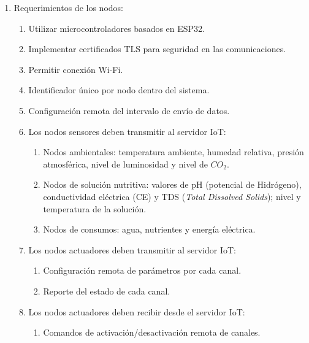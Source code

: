 \begin{enumerate}
      \item Requerimientos de los nodos:
            \begin{enumerate}
                  \item Utilizar microcontroladores basados en ESP32.
                  \item Implementar certificados TLS para seguridad en las comunicaciones.
                  \item Permitir conexión Wi-Fi.
                  \item Identificador único por nodo dentro del sistema.
                  \item Configuración remota del intervalo de envío de datos.
                  \item Los nodos sensores deben transmitir al servidor IoT:
                        \begin{enumerate}
                              \item Nodos ambientales: temperatura ambiente, humedad relativa, presión atmosférica, nivel de
                                    luminosidad y nivel de $CO_2$.
                              \item Nodos de solución nutritiva: valores de pH (potencial de Hidrógeno),
                                    conductividad eléctrica (CE) y TDS (\textit{Total Dissolved Solids}); nivel y
                                    temperatura de la solución.
                              \item Nodos de consumos: agua, nutrientes y energía eléctrica.
                        \end{enumerate}
                  \item Los nodos actuadores deben transmitir al servidor IoT:
                        \begin{enumerate}
                              \item Configuración remota de parámetros por cada canal.
                              \item Reporte del estado de cada canal.
                        \end{enumerate}
                  \item Los nodos actuadores deben recibir desde el servidor IoT:
                        \begin{enumerate}
                              \item Comandos de activación/desactivación remota de canales.
                        \end{enumerate}
            \end{enumerate}


\end{enumerate}
